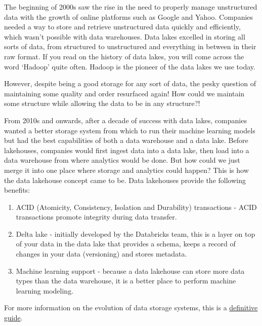 \documentclass[
]{book}
\begin{document}
The beginning of 2000s saw the rise in the need to properly manage unstructured data with the growth of online platforms such as Google and Yahoo. Companies needed a way to store and retrieve unstructured data quickly and efficiently, which wasn't possible with data warehouses. Data lakes excelled in storing all sorts of data, from structured to unstructured and everything in between in their raw format. If you read on the history of data lakes, you will come across the word `Hadoop' quite often. Hadoop is the pioneer of the data lakes we use today.

However, despite being a good storage for any sort of data, the pesky question of maintaining some quality and order resurfaced again! How could we maintain some structure while allowing the data to be in any structure?!

From 2010s and onwards, after a decade of success with data lakes, companies wanted a better storage system from which to run their machine learning models but had the best capabilities of both a data warehouse and a data lake. Before lakehouses, companies would first ingest data into a data lake, then load into a data warehouse from where analytics would be done. But how could we just merge it into one place where storage and analytics could happen? This is how the data lakehouse concept came to be. Data lakehouses provide the following benefits:

\begin{enumerate}
\def\labelenumi{\arabic{enumi}.}
\item
  ACID (Atomicity, Consistency, Isolation and Durability) transactions - ACID transactions promote integrity during data transfer.
\item
  Delta lake - initially developed by the Databricks team, this is a layer on top of your data in the data lake that provides a schema, keeps a record of changes in your data (versioning) and stores metadata.
\item
  Machine learning support - because a data lakehouse can store more data types than the data warehouse, it is a better place to perform machine learning modeling.
\end{enumerate}

For more information on the evolution of data storage systems, this is a \href{https://www.databricks.com/blog/2021/05/19/evolution-to-the-data-lakehouse.html}{definitive guide}.
\end{document}
